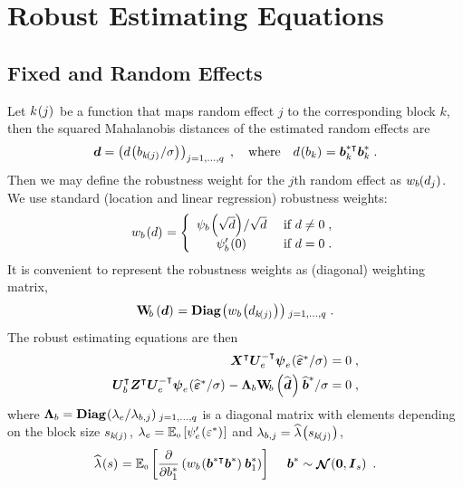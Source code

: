 \documentclass[11pt, a4paper]{article}
\let\wtilde\widetilde
\renewcommand{\widetilde}{\widehat}
\newcommand{\fn}[1]{\kern-1pt\left(#1\right)\kern+0.5pt}
\newcommand{\fns}[1]{\kern-0.5pt(#1)}
\newcommand{\bld}[1]{\boldsymbol{#1}}
\renewcommand{\vec}[1]{\bld{#1}}
\newcommand{\tv}[2][]{{\widetilde{\vec{#2}}_{#1}}}
\newcommand{\vbs}{\vec b^{*}}
\newcommand{\vbstr}{\vec b^{*\intercal}}
\newcommand{\tvbs}{\widetilde{\vec{b}}^{\raisebox{-0.75ex}{\scriptsize *}}}
\newcommand{\bs}{b^{*}}
\newcommand{\es}{\varepsilon^{*}}
\newcommand{\tves}{\widetilde{\vec{\varepsilon}}^{\raisebox{-0.75ex}{\scriptsize *}}}
\newcommand{\U}[2][-0.15ex]{\bld{U}_{\hspace{#1}#2\hspace{0.25ex}}}
\newcommand{\Ue}{\U{e}}
\newcommand{\Ub}{\U{b}}
\newcommand{\W}[1][b]{\text{\textbf{W}}_{\hspace{-0.5ex}#1\hspace{0.25ex}}}
\newcommand{\tr}{^{\intercal}}
\newcommand{\trinv}{^{-\raisebox{0.3ex}{\scriptsize$\intercal$}}}
\newcommand{\diag}{\mbox{\textbf{Diag}}}
\newcommand{\ERWSymbol}{\mathbb{E}}
\newcommand{\makeright}[2]{\ifx#1\left\right#2\else#1#2\fi}
\newcommand{\Xsub}[2]{{#1}_{\mathrm{\scriptscriptstyle #2}}}
\newcommand{\ERWi}[3][\left] {\Xsub{\ERWSymbol}{#2}    #1[ #3
    \makeright{#1}{]}}
\DeclareMathOperator{\N}{\mathcal{N}}
\theoremstyle{note}
\begin{document}
\section{Robust Estimating Equations}
\label{sec:eeq}
\subsection{Fixed and Random Effects}
Let $k\fn{j}$ be a function that maps random effect $j$ to the
corresponding block $k$, then the squared Mahalanobis distances of the
estimated random effects are
\begin{equation*}
  \vec d = \left(d\fn{b_{k\fn{j}}/\sigma}\right)_{j=1,\dots,q}\;,
  \quad \mbox{where} \quad
  d\fn{b_k} = \vbstr_k\vbs_k\;.
\end{equation*}
Then we may define the robustness weight for the $j$th random effect as
$w_b\fns{d_j}$. We use standard (location and linear regression) robustness
weights:
\begin{equation*}
    w_b\fn{d} = \left\{
      \begin{array}{cl}
        {\psi_b\fn{\sqrt{d}}}/\sqrt{d} & \mbox{ if } d \neq 0\;, \\
        \psi_b'\fn{0} & \mbox{ if } d = 0\;.
      \end{array}
    \right.
\end{equation*}
It is convenient to represent the robustness weights as (diagonal)
weighting matrix,
\begin{equation*}
  \W\fn{\vec d} =
  \diag\fn{w_b\fn{d_{k\fn{j}}}}_{j=1,\dots,q}\;.
\end{equation*}
The robust estimating equations are then
\begin{equation}
  \label{eq:robustEEq}
  \begin{split}
    \bld X\tr\Ue\trinv \bld\psi_e\fn{{\tves}/{\sigma}}
    = {} & 0\;, \\
    \Ub\tr\bld Z\tr\Ue\trinv \bld\psi_e\fn{{\tves}/{\sigma}} -
    \bld\Lambda_b \W\fn{\tv d}{\tvbs}/{\sigma}
    = {} & 0\;,
  \end{split}
\end{equation}
where $\bld\Lambda_b = \diag\fn{\lambda_{e}/\lambda_{b,j}}_{j=1,\dots,q}$
is a diagonal matrix with elements depending on the block size
$s_{k\fn{j}}$, $\lambda_e = \ERWi{0}{\psi'_e\fn{\es}}$ and
$\lambda_{b,j} = \wtilde\lambda\fn{s_{k\fn{j}}}$,
\begin{equation*}
  \wtilde\lambda\fn{s} = \ERWi{0}{\frac{\partial}{\partial \bs_1}
    \left(
      w_b\fn{\vbstr\vbs}\vbs_1
  \right)}\; \quad \vbs \sim \bld{\N}\fn{\vec 0, \bld I_s}\;.
\end{equation*}
\end{document}
